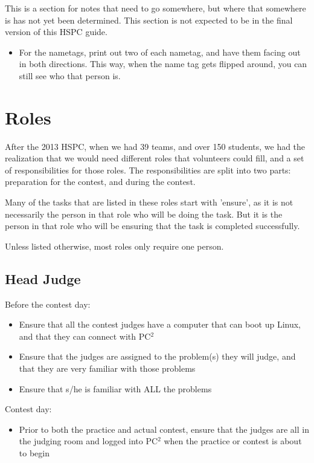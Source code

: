 \documentclass[11pt,twoside,letterpaper]{book}
\newenvironment{itemlist}{
\begin{itemize}
\setlength{\itemsep}{0pt}
\setlength{\parskip}{0pt}}
{\end{itemize}}
\begin{document}
This is a section for notes that need to go somewhere, but where that
somewhere is has not yet been determined.  This section is not
expected to be in the final version of this HSPC guide.

\begin{itemize}
\item For the nametags, print out two of each nametag, and have them
  facing out in both directions.  This way, when the name tag gets
  flipped around, you can still see who that person is.
\end{itemize}

\section{Roles}

After the 2013 HSPC, when we had 39 teams, and over 150 students, we
had the realization that we would need different roles that volunteers
could fill, and a set of responsibilities for those roles.  The
responsibilities are split into two parts: preparation for the
contest, and during the contest.

Many of the tasks that are listed in these roles start with 'ensure',
as it is not necessarily the person in that role who will be doing the
task.  But it is the person in that role who will be ensuring that the
task is completed successfully.

Unless listed otherwise, most roles only require one person.

\subsection{Head Judge}

\noindent Before the contest day:

\begin{itemlist}
\item Ensure that all the contest judges have a computer that can boot
  up Linux, and that they can connect with PC$^2$
\item Ensure that the judges are assigned to the problem(s) they will
  judge, and that they are very familiar with those problems
\item Ensure that s/he is familiar with ALL the problems
\end{itemlist}

\noindent Contest day:

\begin{itemlist}
\item Prior to both the practice and actual contest, ensure that the
  judges are all in the judging room and logged into PC$^2$ when the
  practice or contest is about to begin
\end{itemlist}
\end{document}
